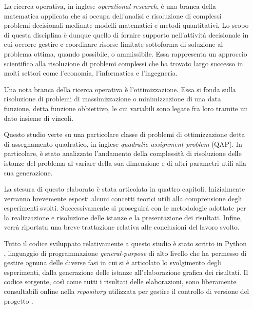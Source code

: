 La ricerca operativa, in inglese \textit{operational research}, è una branca della matematica applicata 
che si occupa dell'analisi e risoluzione di complessi problemi decisionali mediante modelli matematici e 
metodi quantitativi. Lo scopo di questa disciplina è dunque quello di fornire supporto nell'attività 
decisionale in cui occorre gestire e coordinare risorse limitate sottoforma di soluzione al problema ottima, 
quando possibile, o ammissibile. Essa rappresenta un approccio scientifico alla risoluzione di problemi 
complessi che ha trovato largo successo in molti settori come l'economia, l'informatica e l'ingegneria.

Una nota branca della ricerca operativa è l'ottimizzazione. Essa si fonda sulla risoluzione di problemi di 
massimizzazione o minimizzazione di una data funzione, detta funzione obbiettivo, le cui variabili sono legate 
fra loro tramite un dato insieme di vincoli.

Questo studio verte su una particolare classe di problemi di ottimizzazione detta di assegnamento quadratico,
in inglese \textit{quadratic assignment problem} (QAP). In particolare, è stato analizzato l'andamento della
complessità di risoluzione delle istanze del problema al variare della sua dimensione e di altri parametri 
utili alla sua generazione.

La stesura di questo elaborato è stata articolata in quattro capitoli. Inizialmente verranno brevemente esposti
alcuni concetti teorici utili alla comprensione degli esperimenti svolti. Successivamente si proseguirà con le
metodologie adottate per la realizzazione e risoluzione delle istanze e la presentazione dei risultati. Infine,
verrà riportata una breve trattazione relativa alle conclusioni del lavoro svolto.

Tutto il codice sviluppato relativamente a questo studio è stato scritto in Python \cite{python}, linguaggio di 
programmazione \textit{general-purpose} di alto livello che ha permesso di gestire ognuna delle diverse fasi in 
cui si è articolato lo svolgimento degli esperimenti, dalla generazione delle istanze all'elaborazione grafica dei 
risultati. Il codice sorgente, così come tutti i risultati delle elaborazioni, sono liberamente consultabili 
online nella \textit{repository} utilizzata per gestire il controllo di versione del progetto \cite{repository}.